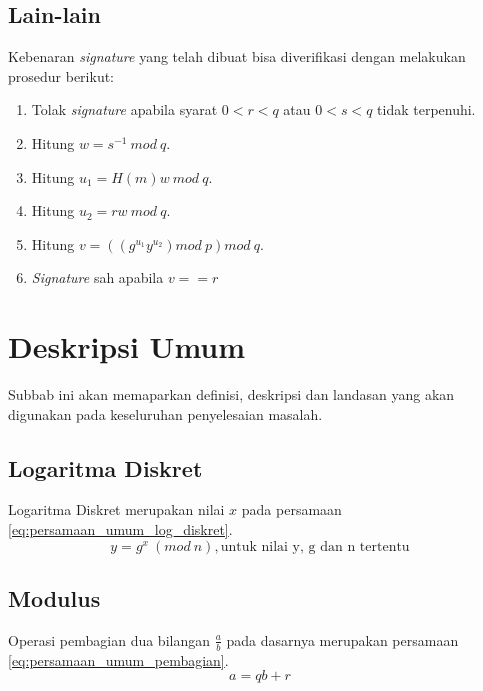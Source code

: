 \subsection {Lain-lain}
Kebenaran \textit{signature} yang telah dibuat bisa diverifikasi dengan melakukan prosedur berikut:

\begin{enumerate}
\item Tolak \textit{signature} apabila syarat $0 < r < q$ atau $0 < s < q$ tidak terpenuhi.
\item Hitung $w = s^{-1}\ mod\ q$.
\item Hitung $u_1 = H(m) w\ mod\ q$.
\item Hitung $u_2 = r w\ mod\ q$.
\item Hitung $v = \left(\left(g^{u_1} y^{u_2}\right) mod\ p\right) mod\ q$.
\item \textit{Signature} sah apabila $v == r$
\end{enumerate}

\section{Deskripsi Umum}

Subbab ini akan memaparkan definisi, deskripsi dan landasan yang akan digunakan pada keseluruhan penyelesaian masalah.

\subsection{Logaritma Diskret}
Logaritma Diskret merupakan nilai $ x $ pada persamaan \eqref{eq:persamaan_umum_log_diskret}.
\begin{equation}
y = g^{x}\ (mod\ n),\text{untuk nilai y, g dan n tertentu}
\label{eq:persamaan_umum_log_diskret}
\end{equation}

\subsection{Modulus}
Operasi pembagian dua bilangan $\frac{a}{b}$ pada dasarnya merupakan persamaan \eqref{eq:persamaan_umum_pembagian}.
\begin{equation}
a=qb+r
\label{eq:persamaan_umum_pembagian}
\end{equation}

